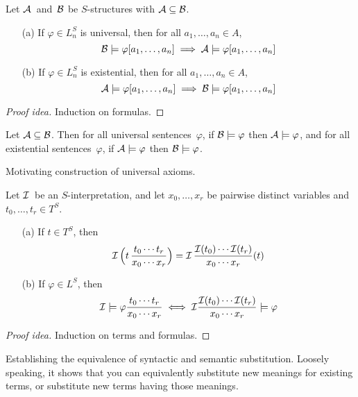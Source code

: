 \begin{thm}[Substructure]
Let \(\mathcal{A}\)~and~\(\mathcal{B}\) be \(S\)-structures with \(\mathcal{A}\subseteq\mathcal{B}\).
\begin{enumerate}[itemsep=0pt]
\item[(a)] If \(\varphi\in L_n^S\) is universal, then for all \(a_1,\ldots,a_n\in A\),
\[\mathcal{B}\models\varphi[a_1,\ldots,a_n]\implies\mathcal{A}\models\varphi[a_1,\ldots,a_n]\]
\item[(b)] If \(\varphi\in L_n^S\) is existential, then for all \(a_1,\ldots,a_n\in A\),
\[\mathcal{A}\models\varphi[a_1,\ldots,a_n]\implies\mathcal{B}\models\varphi[a_1,\ldots,a_n]\]
\end{enumerate}
\end{thm}
\begin{proof}[Proof idea]
Induction on formulas.
\end{proof}
\begin{cor}
Let \(\mathcal{A}\subseteq\mathcal{B}\). Then for all universal sentences~\(\varphi\), if \(\mathcal{B}\models\varphi\) then \(\mathcal{A}\models\varphi\), and for all existential sentences~\(\varphi\), if \(\mathcal{A}\models\varphi\) then \(\mathcal{B}\models\varphi\).
\end{cor}
\begin{app}
Motivating construction of universal axioms.
\end{app}

\begin{thm}[Substitution]
Let \(\mathcal{I}\)~be an \(S\)-interpretation, and let \(x_0,\ldots,x_r\) be pairwise distinct variables and \(t_0,\ldots,t_r\in T^S\).
\begin{enumerate}[itemsep=0pt]
\item[(a)] If \(t\in T^S\), then
\[\mathcal{I}\,\Bigl(t\,\frac{t_0\cdots t_r}{x_0\cdots x_r}\Bigr)=\mathcal{I}\,\frac{\mathcal{I}(t_0)\cdots\mathcal{I}(t_r)}{x_0\cdots x_r}(t)\]
\item[(b)] If \(\varphi\in L^S\), then
\[\mathcal{I}\models\varphi\frac{t_0\cdots t_r}{x_0\cdots x_r}\iff\mathcal{I}\frac{\mathcal{I}(t_0)\cdots\mathcal{I}(t_r)}{x_0\cdots x_r}\models\varphi\]
\end{enumerate}
\end{thm}
\begin{proof}[Proof idea]
Induction on terms and formulas.
\end{proof}
\begin{app}
Establishing the equivalence of syntactic and semantic substitution. Loosely speaking, it shows that you can equivalently substitute new meanings for existing terms, or substitute new terms having those meanings.
\end{app}